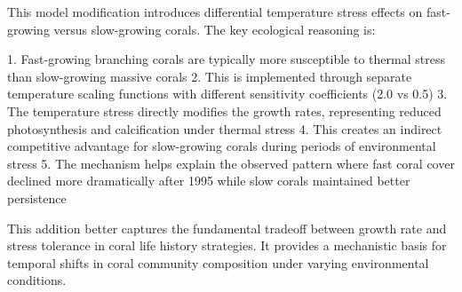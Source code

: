 This model modification introduces differential temperature stress effects on fast-growing versus slow-growing corals. The key ecological reasoning is:

1. Fast-growing branching corals are typically more susceptible to thermal stress than slow-growing massive corals
2. This is implemented through separate temperature scaling functions with different sensitivity coefficients (2.0 vs 0.5)
3. The temperature stress directly modifies the growth rates, representing reduced photosynthesis and calcification under thermal stress
4. This creates an indirect competitive advantage for slow-growing corals during periods of environmental stress
5. The mechanism helps explain the observed pattern where fast coral cover declined more dramatically after 1995 while slow corals maintained better persistence

This addition better captures the fundamental tradeoff between growth rate and stress tolerance in coral life history strategies. It provides a mechanistic basis for temporal shifts in coral community composition under varying environmental conditions.
